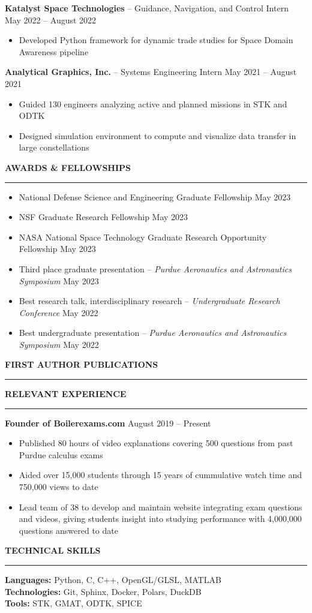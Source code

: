 \documentclass[11pt, a4paper]{article}
\newcommand{\sectiontitle}[1]{{\Large \textbf{#1}}\vspace{0.5em}\hrule\vspace{0.5em}}
\begin{document}
\textbf{Katalyst Space Technologies} -- Guidance, Navigation, and Control Intern \hfill May 2022 -- August 2022
\begin{itemize}[noitemsep]
    \item Developed Python framework for dynamic trade studies for Space Domain Awareness pipeline
\end{itemize}

\textbf{Analytical Graphics, Inc.} -- Systems Engineering Intern \hfill May 2021 -- August 2021
\begin{itemize}[noitemsep]
    \item Guided 130 engineers analyzing active and planned missions in STK and ODTK
    \item Designed simulation environment to compute and visualize data transfer in large constellations
\end{itemize}

\sectiontitle{AWARDS \& FELLOWSHIPS}
\begin{itemize}[noitemsep]
    \item National Defense Science and Engineering Graduate Fellowship \hfill May 2023
    \item NSF Graduate Research Fellowship \hfill May 2023
    \item NASA National Space Technology Graduate Research Opportunity Fellowship \hfill May 2023
    \item Third place graduate presentation -- \textit{Purdue Aeronautics and Astronautics Symposium} \hfill May 2023
    \item Best research talk, interdisciplinary research -- \textit{Undergraduate Research Conference} \hfill May 2022
    \item Best undergraduate presentation -- \textit{Purdue Aeronautics and Astronautics Symposium} \hfill May 2022
\end{itemize}

\sectiontitle{FIRST AUTHOR PUBLICATIONS}
\nocite{*}
\printbibliography[heading=none]

\sectiontitle{RELEVANT EXPERIENCE}
\textbf{Founder of Boilerexams.com} \hfill August 2019 -- Present
\begin{itemize}[noitemsep]
    \item Published 80 hours of video explanations covering 500 questions from past Purdue calculus exams
    \item Aided over 15,000 students through 15 years of cummulative watch time and 750,000 views to date
    \item Lead team of 38 to develop and maintain website integrating exam questions and videos, giving students
    insight into studying performance with 4,000,000 questions answered to date
\end{itemize}

\sectiontitle{TECHNICAL SKILLS}
\textbf{Languages:} Python, C, C++, OpenGL/GLSL, MATLAB \\
\textbf{Technologies:} Git, Sphinx, Docker, Polars, DuckDB \\
\textbf{Tools:} STK, GMAT, ODTK, SPICE \\
\end{document}
